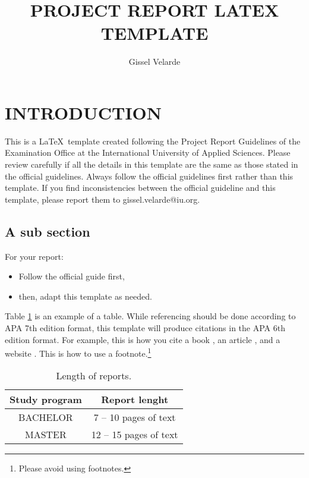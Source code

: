\documentclass[11pt,a4paper]{article}
\title{PROJECT REPORT LATEX TEMPLATE}
\author{ Gissel Velarde }
\begin{document}
\maketitle	

 \tableofcontents
 \pagebreak

\section{INTRODUCTION}
This is a \LaTeX\  template created following the Project Report Guidelines of the Examination Office at the International University of Applied Sciences. Please review carefully if all the details in this template are the same as those stated in the official guidelines. Always follow the official guidelines first rather than this template. If you find inconsistencies between the official guideline and this template, please report them to gissel.velarde@iu.org.

\subsection{A sub section}
For your report:

\begin{itemize}
\item Follow the official guide first,
\item then, adapt this template as needed. 
\end{itemize}

Table \ref{table:1} is an example of a table. While referencing should be done according to APA 7th edition format, this template will produce citations in the APA 6th edition format.  For example, this is how you cite a book \cite{velarde2023artificial}, an article \cite{saito2015precision}, and a website \cite{Velarde-Nvidia}. This is how to use a footnote.\footnote{Please avoid using footnotes.} 

\begin{table}[h!]
\centering
\begin{tabular}{||c c||} 
 \hline
Study program &  Report lenght \\ [0.5ex] 
 \hline\hline
BACHELOR &  7 -- 10  pages of text  \\ 
MASTER  & 12 -- 15 pages of text\\

 \hline
\end{tabular}
\caption{Length of reports.}
\label{table:1}
\end{table}
\end{document}
